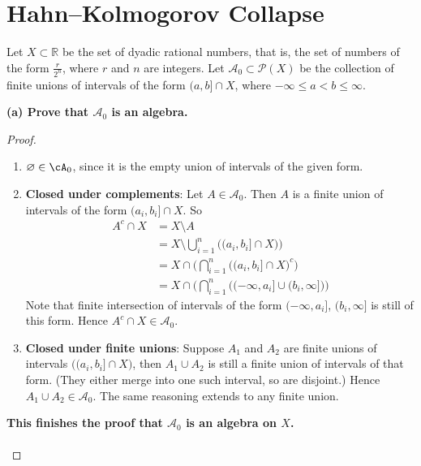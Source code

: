 \documentclass[lang=cn,11pt]{elegantbook}
\begin{document}
\section{Hahn–Kolmogorov Collapse}
Let \(X \subset \mathbb{R}\) be the set of dyadic rational numbers, that is, the set of numbers of the form \(\frac{r}{2^n}\), where \(r\) and \(n\) are integers. Let \(\mathcal{A}_0 \subset \mathcal{P}(X)\) be the collection of finite unions of intervals of the form \((a, b] \cap X\), where \(-\infty \leq a < b \leq \infty\).

\noindent \textbf{(a) Prove that \(\mathcal{A}_0\) is an algebra.}
\begin{proof}
\begin{enumerate}
    \item \(\varnothing \in \cA_0\), since it is the empty union of intervals of the given form.
    \item \textbf{Closed under complements}:  Let \(A\in \mathcal{A}_0\). Then \(A\) is a finite union of intervals of the form \((a_i,b_i]\cap X\).  So  \begin{align}
     A^c \cap X  &= X\setminus A \\
     &=  X\setminus \bigcup_{i=1}^n \bigl((a_i,b_i]\cap X\bigr) \bigr) \\
     &=
 X\cap \bigl(\bigcap_{i=1}^n \bigl((a_i,b_i]\cap X\bigr)^c \bigr) \\
    &  =  X\cap \bigl(\bigcap_{i=1}^n \bigl((-\infty, a_i] \cup (b_i, \infty]\bigr) \bigr)
\end{align} 
Note that finite intersection of intervals of the form \((-\infty,a_i]\), \((b_i,\infty]\) is still of this form. Hence \(A^c\cap X\in \mathcal{A}_0\).
    \item \textbf{Closed under finite unions}: Suppose \(A_1\) and \(A_2\) are finite unions of intervals \(\bigl((a_i,b_i]\cap X\bigr)\), then \(A_1\cup A_2\) is still a finite union of intervals of that form. (They either merge into one such interval, so are disjoint.) Hence \(A_1\cup A_2\in \mathcal{A}_0\).  The same reasoning extends to any finite union.
\end{enumerate}
\noindent \textbf{This finishes the proof that \(\mathcal{A}_0\) is an algebra on \(X\).}\\\\
\end{proof}
\end{document}
